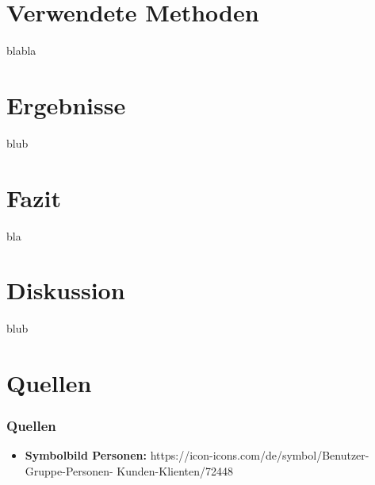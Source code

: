 \documentclass{beamer}
\begin{document}
\section{Verwendete Methoden}
\begin{frame}
 blabla
\end{frame}



\section{Ergebnisse}
\begin{frame}
blub
\end{frame}
 
 
\section{Fazit}
\begin{frame}
bla
\end{frame}


\section{Diskussion}
\begin{frame}
blub
\end{frame}


\section{Quellen}
\begin{frame}
\frametitle{Quellen}
  \begin{itemize}
    \item \textbf{Symbolbild Personen:}
    https://icon-icons.com/de/symbol/Benutzer-Gruppe-Personen-   Kunden-Klienten/72448
  \end{itemize}

\end{frame}
\end{document}
